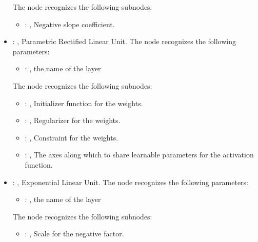 \begin{itemize}
      The  node recognizes the following subnodes:
      \begin{itemize}
        \item {}: , 
          Negative slope coefficient.
      \end{itemize}

    \item {}: , 
      Parametric Rectified Linear Unit.
      The  node recognizes the following parameters:
        \begin{itemize}
          \item {}: , 
            the name of the layer
      \end{itemize}

      The  node recognizes the following subnodes:
      \begin{itemize}
        \item {}: , 
          Initializer function for the weights.

        \item {}: , 
          Regularizer for the weights.

        \item {}: , 
          Constraint for the weights.

        \item {}: , 
          The axes along which to share learnable parameters for the activation function.
      \end{itemize}

    \item {}: , 
      Exponential Linear Unit.
      The  node recognizes the following parameters:
        \begin{itemize}
          \item {}: , 
            the name of the layer
      \end{itemize}

      The  node recognizes the following subnodes:
      \begin{itemize}
        \item {}: , 
          Scale for the negative factor.
      \end{itemize}


\end{itemize}
